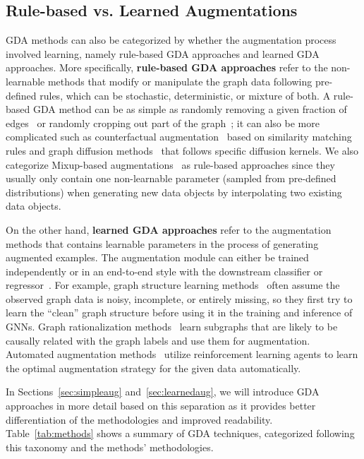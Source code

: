\documentclass[11pt]{article}
\begin{document}
\subsection{Rule-based vs. Learned Augmentations}

GDA methods can also be categorized by whether the augmentation process involved learning, namely rule-based GDA approaches and learned GDA approaches. More specifically, \textbf{rule-based GDA approaches} refer to the non-learnable methods that modify or manipulate the graph data following pre-defined rules, which can be stochastic, deterministic, or mixture of both. A rule-based GDA method can be as simple as randomly removing a given fraction of edges~\cite{rong2019dropedge} or randomly cropping out part of the graph~\cite{you2020graph}; it can also be more complicated such as counterfactual augmentation~\cite{zhao2021counterfactual} based on similarity matching rules and graph diffusion methods~\cite{klicpera2019diffusion} that follows specific diffusion kernels. We also categorize Mixup-based augmentations~\cite{han2022G} as rule-based approaches since they usually only contain one non-learnable parameter (sampled from pre-defined distributions) when generating new data objects by interpolating two existing data objects. 

On the other hand, \textbf{learned GDA approaches} refer to the augmentation methods that contains learnable parameters in the process of generating augmented examples. The augmentation module can either be trained independently or in an end-to-end style with the downstream classifier or regressor~\cite{zhao2021data}. For example, graph structure learning methods~\cite{zhu2021survey,jin2020graph,zhao2021data} often assume the observed graph data is noisy, incomplete, or entirely missing, so they first try to learn the ``clean'' graph structure before using it in the training and inference of GNNs. Graph rationalization methods~\cite{wu2021discovering,liu2022graph} learn subgraphs that are likely to be causally related with the graph labels and use them for augmentation. Automated augmentation methods~\cite{zhao2022autogda,luo2022automated} utilize reinforcement learning agents to learn the optimal augmentation strategy for the given data automatically. 

In Sections~\ref{sec:simpleaug} and~\ref{sec:learnedaug}, we will introduce GDA approaches in more detail based on this separation as it provides better differentiation of the methodologies and improved readability. Table~\ref{tab:methods} shows a summary of GDA techniques, categorized following this taxonomy and the methods' methodologies.
\end{document}
